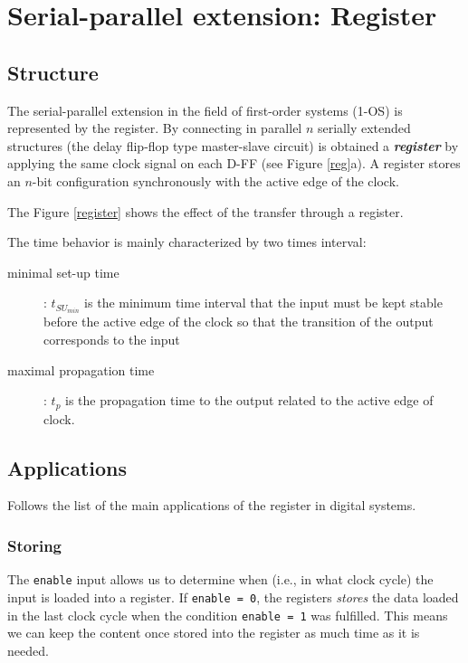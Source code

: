 \section{Serial-parallel extension: Register}

\subsection{Structure}

The serial-parallel extension in the field of first-order systems (1-OS) is represented by the register. By connecting in parallel $n$ serially extended  structures (the delay flip-flop type master-slave circuit) is obtained a {\bf {\em register}} by applying the same clock signal on each D-FF (see Figure \ref{reg}a). A register stores an $n$-bit configuration synchronously with the active edge of the clock.


The Figure \ref{register} shows the effect of the transfer through a register.


The time behavior is mainly characterized by two times interval:
\begin{description}
    \item[minimal set-up time]: $t_{SU_{min}}$ is the minimum time interval that the input must be kept stable before the active edge of the clock so that the transition of the output corresponds to the input
    \item[maximal propagation time]: $t_p$ is the propagation time to the output related to the active edge of clock.
\end{description}

\subsection{Applications}

Follows the list of the main applications of the register in digital systems.

\subsubsection{Storing}
The {\tt enable} input allows us to determine when (i.e., in what
clock cycle) the input is loaded into a register. If {\tt enable =
0}, the registers {\em stores} the data loaded in the last clock
cycle when the condition {\tt enable = 1} was fulfilled. This
means we can keep the content once stored into the register as
much time as it is needed.

